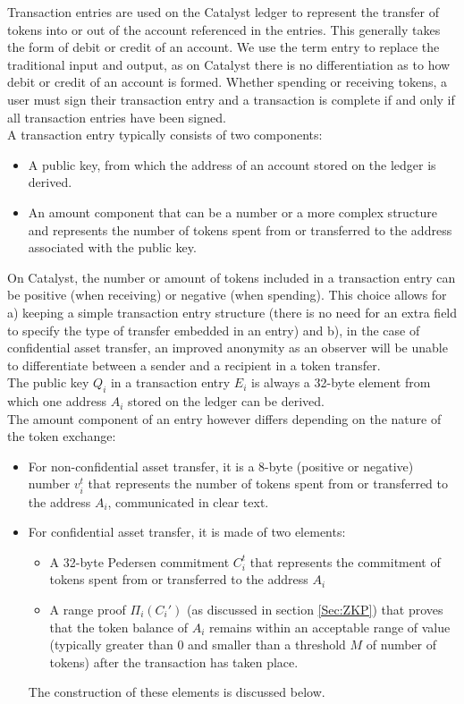Transaction entries are used on the Catalyst ledger to represent the transfer of tokens into or out of the account referenced in the entries. This generally takes the form of debit or credit of an account. We use the term entry to replace the traditional input and output, as on Catalyst there is no differentiation as to how debit or credit of an account is formed. Whether spending or receiving tokens, a user must sign their transaction entry and a transaction is complete if and only if all transaction entries have been signed.\\

 A transaction entry typically consists of two components: 
 \begin{itemize}
\item A public key, from which the address of an account stored on the ledger is derived.
\item An amount component that can be a number or a more complex structure and represents the number of tokens spent from or transferred to the address associated with the public key.
\end{itemize}
On Catalyst, the number or amount of tokens included in a transaction entry can be positive (when receiving) or negative (when spending). This  choice allows for a) keeping a simple transaction entry structure (there is no need for an extra field to specify the type of transfer embedded in an entry) and b), in the case of confidential asset transfer, an improved anonymity as an observer will be unable to differentiate between a sender and a recipient in a token transfer. \\

The public key $Q_i$ in a transaction entry $E_i$ is always a 32-byte element from which one address $A_i$ stored on the ledger can be derived. \\

The amount component of an entry however differs depending on the nature of the token exchange:

\begin{itemize}
\item For non-confidential asset transfer, it is a 8-byte (positive or negative) number $v^t_i$ that represents the number of tokens spent from or transferred to the address $A_i$, communicated in clear text.
\item For confidential asset transfer, it is made of two elements: 
\begin{itemize}
\item A 32-byte Pedersen commitment $C_{i}^{t}$ that represents the commitment of tokens spent from or transferred to the address $A_i$ 
\item A range proof $\Pi_i(C_{i}')$ (as discussed in section \ref{Sec:ZKP}) that proves that the token balance of $A_i$ remains within an acceptable range of value (typically greater than 0 and smaller than a threshold $M$ of number of tokens) after the transaction has taken place.
\end{itemize}
 The construction of these elements is discussed below. 
\end{itemize}

